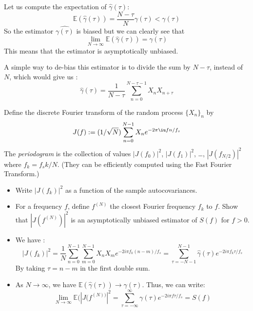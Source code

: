 \documentclass[11pt]{article}
\begin{document}
\begin{solution}
Let us compute the expectation of $\hat{\gamma}(\tau)$:
\begin{equation}
    \mathbb{E}(\hat{\gamma}(\tau))=\frac{N - \tau}{N}\gamma(\tau)<\gamma(\tau)
\end{equation}
So the estimator $\hat{\gamma(\tau)}$ is biased but we can clearly see that
\begin{equation}
    \lim_{N \to \infty} \mathbb{E}(\hat{\gamma}(\tau))= \gamma(\tau)
\end{equation}
This means that the estimator is asymptotically unbiased. 

A simple way to de-bias this estimator is to divide the sum by $N-\tau$, instead of $N$, which would give us :
\begin{equation}
    \hat{\gamma}(\tau)=\frac{1}{N-\tau}\sum_{n=0}^{N-\tau-1}X_nX_{n+\tau}
\end{equation}
\end{solution}

\begin{exercise}
Define the discrete Fourier transform of the random process $\{X_n\}_n$ by
\begin{equation}
    J(f) := (1/\sqrt{N})\sum_{n=0}^{N-1} X_n e^{-2\pi\iu f n/f_s}
\end{equation}
The \textit{periodogram} is the collection of values $|J(f_0)|^2$, $|J(f_1)|^2$, \dots, $|J(f_{N/2})|^2$ where $f_k = f_s k/N$.
(They can be efficiently computed using the Fast Fourier Transform.)
\begin{itemize}
    \item Write $|J(f_k)|^2$ as a function of the sample autocovariances.
    \item For a frequency $f$, define $f^{(N)}$ the closest Fourier frequency $f_k$ to $f$.
    Show that $|J(f^{(N)})|^2$ is an asymptotically unbiased estimator of $S(f)$ for $f>0$.
\end{itemize}
\end{exercise}

\begin{solution}
    \begin{itemize}
        \item We have :
            \begin{equation}
                |J(f_k)|^2=\frac{1}{N}\sum_{n=0}^{N-1}\sum_{m=0}^{N-1}X_nX_me^{-2i\pi f_k(n-m)/f_s}=\sum_{\tau=-N-1}^{N-1}\hat{\gamma}(\tau)e^{-2i\pi f_k\tau/f_s}
            \end{equation}
            By taking $\tau=n-m$ in the first double sum.
        \item As $N \to \infty$, we have $\mathbb{E}(\hat{\gamma}(\tau))\to\gamma(\tau)$. Thus, we can write:
        \begin{equation}
            \lim_{N\to\infty}\mathbb{E}(|J(f^{(N))}|^2=\sum_{\tau=-\infty}^\infty\gamma(\tau)e^{-2i\pi f\tau/f_s}=S(f)
        \end{equation}
    \end{itemize}
    
\end{solution}
\end{document}

